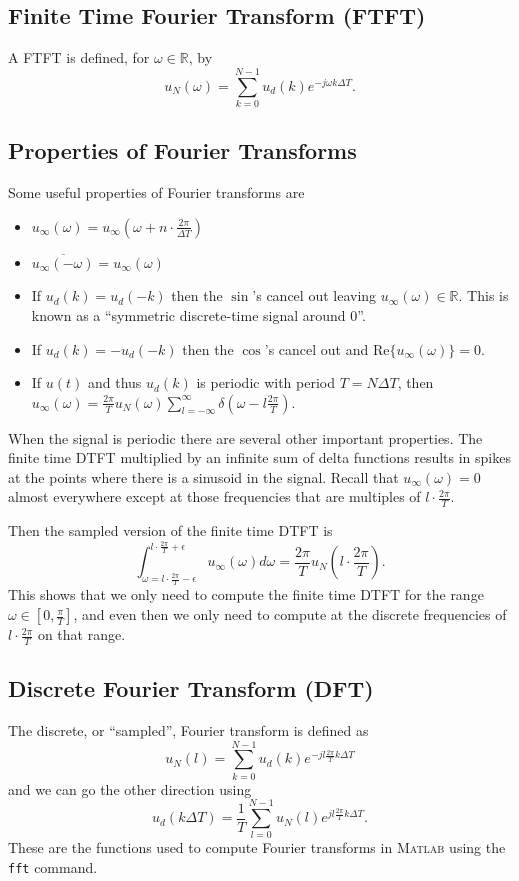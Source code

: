 \documentclass[lecture,12pt,]{pcms-l}
\theoremstyle{example}
\newcommand{\w}{\omega}
\begin{document}
\subsection{Finite Time Fourier Transform (FTFT)}
A FTFT is defined, for $\w\in\mathbb{R}$, by
$$u_N(\w) = \sum_{k=0}^{N-1} u_d(k) e^{-j\w k\Delta T}.$$

\subsection{Properties of Fourier Transforms}
Some useful properties of Fourier transforms are
\begin{itemize}
\item $u_\infty(\w) = u_\infty(\w + n\cdot \frac{2\pi}{\Delta T})$
\item $\overline{u_\infty(-\w)} = u_\infty(\w)$
\item If $u_d(k) = u_d(-k)$ then the $\sin$'s cancel out leaving $u_\infty(\w)\in\mathbb{R}$. This is known as a ``symmetric discrete-time signal around $0$''.
\item If $u_d(k) = -u_d(-k)$ then the $\cos$'s cancel out and $\text{Re}\lbrace u_\infty(\w)\rbrace = 0$.
\item If $u(t)$ and thus $u_d(k)$ is periodic with period $T=N\Delta T$, then $u_\infty(\w) = \frac{2\pi}{T}u_N(\w) \sum_{l=-\infty}^\infty \delta(\w-l\frac{2\pi}{T})$.
\end{itemize}
When the signal is periodic there are several other important properties. The finite time DTFT multiplied by an infinite sum of delta functions results in spikes at the points where there is a sinusoid in the signal. Recall that $u_\infty(\w)=0$ almost everywhere except at those frequencies that are multiples of $l\cdot \frac{2\pi}{T}$.

Then the sampled version of the finite time DTFT is
$$\int_{\w=l\cdot \frac{2\pi}{T}-\epsilon}^{l\cdot \frac{2\pi}{T}+\epsilon} u_\infty(\w)d\w
= \frac{2\pi}{T}u_N(l\cdot \frac{2\pi}{T}).$$
This shows that we only need to compute the finite time DTFT for the range $\w\in[0,\frac{\pi}{T}]$, and even then we only need to compute at the discrete frequencies of $l\cdot\frac{2\pi}{T}$ on that range.

\subsection{Discrete Fourier Transform (DFT)}
The discrete, or ``sampled'', Fourier transform is defined as
$$u_N(l) = \sum_{k=0}^{N-1} u_d(k) e^{-jl\frac{2\pi}{T}k\Delta T}$$
and we can go the other direction using
$$u_d(k\Delta T) = \frac{1}{T} \sum_{l=0}^{N-1} u_N(l) e^{jl\frac{2\pi}{T}k\Delta T}.$$
These are the functions used to compute Fourier transforms in \textsc{Matlab} using the \texttt{fft} command.
\end{document}

